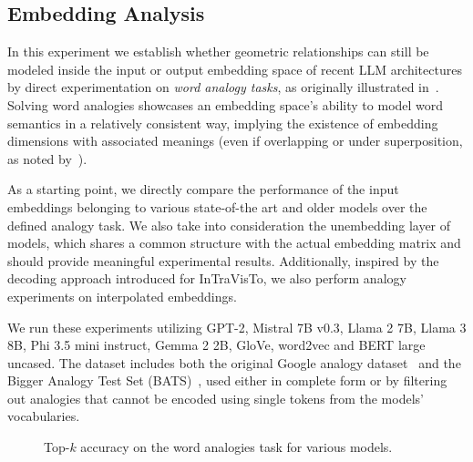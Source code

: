 \documentclass[11pt,a4paper,twocolumn]{article}
\begin{document}
\subsection{Embedding Analysis}

In this experiment we establish whether geometric relationships can still be modeled inside the input or output embedding space of recent LLM architectures by direct experimentation on \emph{word analogy tasks}, as originally illustrated in~\citet{mikolov2013}.
Solving word analogies showcases an embedding space's ability to model word semantics in a relatively consistent way, implying the existence of embedding dimensions with associated meanings (even if overlapping or under superposition, as noted by~\citet{elhage2022}).

As a starting point, we directly compare the performance of the input embeddings belonging to various state-of-the art and older models over the defined analogy task.
We also take into consideration the unembedding layer of models, which shares a common structure with the actual embedding matrix and should provide meaningful experimental results.
Additionally, inspired by the decoding approach introduced for InTraVisTo, we also perform analogy experiments on interpolated embeddings.

We run these experiments utilizing GPT-2, Mistral 7B v0.3, Llama 2 7B, Llama 3 8B, Phi 3.5 mini instruct, Gemma 2 2B, GloVe, word2vec and BERT large uncased.
The dataset includes both the original Google analogy dataset~\cite{mikolov2013} and the Bigger Analogy Test Set (BATS)~\cite{drozd2016}, used either in complete form or by filtering out analogies that cannot be encoded using single tokens from the models' vocabularies.

\begin{figure}[tbh!]
    \vspace{-10pt}
    \centering
    \quad%
    \caption{Top-$k$ accuracy on the word analogies task for various models.}
    \label{fig:exp_emb_1_A}
    \vspace{-10pt}
\end{figure}
\end{document}

